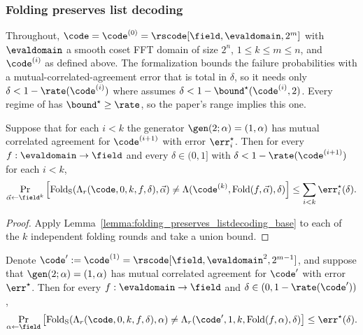 \subsubsection{Folding preserves list decoding}

Throughout, $\code = \code^{(0)} = \rscode[\field, \evaldomain, 2^m]$ with $\evaldomain$ a smooth
coset FFT domain of size $2^n$, $1 \le k \leq m\le n$, and $\code^{(i)}$ as defined above.
The formalization bounds the failure probabilities with a mutual-correlated-agreement error that is
total in $\delta$, so it needs only $\delta<1-\rate(\code^{(i)})$ where \cite{ACFY24} assumes
$\delta<1-{\bound}^\star(\code^{(i)},2)$. Every regime of \cite{ACFY24} has
${\bound}^\star\ge\rate$, so the paper's range implies this one.

\begin{theorem}\label{thm:folding_preserves_listdecoding}
\leanok
{}
    Suppose that for each $i<k$ the generator $\gen(2; \alpha) = (1, \alpha)$ has mutual correlated
    agreement for $\code^{(i+1)}$ with error $\err^\star_i$. Then for every $f : \evaldomain \to
    \field$ and every $\delta \in (0,1]$ with $\delta<1-\rate(\code^{(i+1)})$ for each $i<k$,
    \[
    \Pr_{\vec\alpha \leftarrow \field^k} \left[
    \mathrm{Fold_S}(\Lambda_{r}(\code, 0, k, f, \delta), \vec\alpha)
    \neq \Lambda(\code^{(k)}, \mathrm{Fold}(f, \vec\alpha), \delta)
    \right] \le \sum_{i<k}\err^\star_i(\delta).
    \]
\end{theorem}
\begin{proof}
\leanok
Apply Lemma~\ref{lemma:folding_preserves_listdecoding_base} to each of the $k$ independent
folding rounds and take a union bound.
\end{proof}

\begin{lemma}\label{lemma:folding_preserves_listdecoding_base}
\leanok
{}
    Denote $\code' := \code^{(1)} = \rscode[\field, \evaldomain^{2}, 2^{m - 1}]$, and suppose that
    $\gen(2;\alpha)=(1,\alpha)$ has mutual correlated agreement for $\code'$ with error
    $\err^\star$. Then for every $f : \evaldomain \to \field$ and $\delta \in (0, 1 -
    \rate(\code'))$,
    \[
    \Pr_{\alpha \leftarrow \field} \left[
    \mathrm{Fold_S}(\Lambda_{r}(\code, 0, k, f, \delta), \alpha)
    \neq \Lambda_{r}(\code', 1, k, \mathrm{Fold}(f, \alpha), \delta)
    \right] \le \err^\star(\delta).
    \]
\end{lemma}

